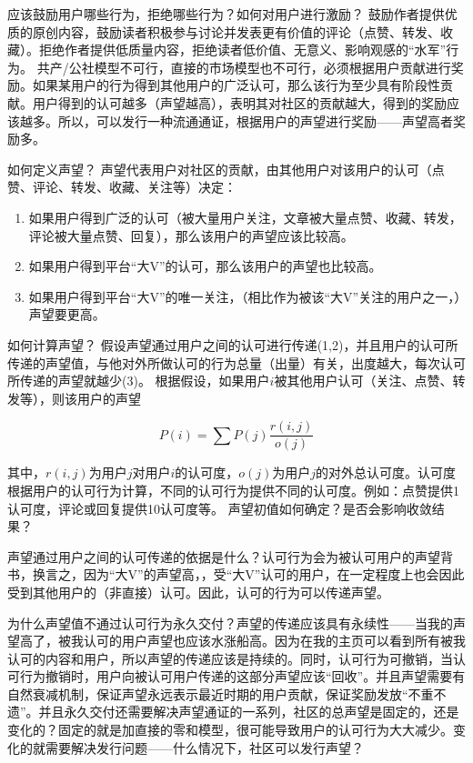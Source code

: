 \documentclass[11pt]{article}
\date{\today}
\title{}
\begin{document}
\tableofcontents

应该鼓励用户哪些行为，拒绝哪些行为？如何对用户进行激励？  
鼓励作者提供优质的原创内容，鼓励读者积极参与讨论并发表更有价值的评论（点赞、转发、收藏）。拒绝作者提供低质量内容，拒绝读者低价值、无意义、影响观感的“水军”行为。  
共产/公社模型不可行，直接的市场模型也不可行，必须根据用户贡献进行奖励。如果某用户的行为得到其他用户的广泛认可，那么该行为至少具有阶段性贡献。用户得到的认可越多（声望越高），表明其对社区的贡献越大，得到的奖励应该越多。所以，可以发行一种流通通证，根据用户的声望进行奖励——声望高者奖励多。  

如何定义声望？  
声望代表用户对社区的贡献，由其他用户对该用户的认可（点赞、评论、转发、收藏、关注等）决定：  

\begin{enumerate}
\item 如果用户得到广泛的认可（被大量用户关注，文章被大量点赞、收藏、转发，评论被大量点赞、回复），那么该用户的声望应该比较高。
\item 如果用户得到平台“大V”的认可，那么该用户的声望也比较高。
\item 如果用户得到平台“大V”的唯一关注，（相比作为被该“大V”关注的用户之一，）声望要更高。
\end{enumerate}

如何计算声望？  
假设声望通过用户之间的认可进行传递(1,2)，并且用户的认可所传递的声望值，与他对外所做认可的行为总量（出量）有关，出度越大，每次认可所传递的声望就越少(3)。  
根据假设，如果用户\(i\)被其他用户认可（关注、点赞、转发等），则该用户的声望  

\begin{equation}
P(i)=\sum P(j)\frac{r(i,j)}{o(j)}
\end{equation}

其中，\(r(i,j)\)为用户\(j\)对用户\(i\)的认可度，\(o(j)\)为用户\(j\)的对外总认可度。认可度根据用户的认可行为计算，不同的认可行为提供不同的认可度。例如：点赞提供1认可度，评论或回复提供10认可度等。  
声望初值如何确定？是否会影响收敛结果？  

声望通过用户之间的认可传递的依据是什么？认可行为会为被认可用户的声望背书，换言之，因为“大V”的声望高，，受“大V”认可的用户，在一定程度上也会因此受到其他用户的（非直接）认可。因此，认可的行为可以传递声望。  

为什么声望值不通过认可行为永久交付？声望的传递应该具有永续性——当我的声望高了，被我认可的用户声望也应该水涨船高。因为在我的主页可以看到所有被我认可的内容和用户，所以声望的传递应该是持续的。同时，认可行为可撤销，当认可行为撤销时，用户向被认可用户传递的这部分声望应该“回收”。并且声望需要有自然衰减机制，保证声望永远表示最近时期的用户贡献，保证奖励发放“不重不遗”。并且永久交付还需要解决声望通证的一系列，社区的总声望是固定的，还是变化的？固定的就是加直接的零和模型，很可能导致用户的认可行为大大减少。变化的就需要解决发行问题——什么情况下，社区可以发行声望？  
\end{document}
